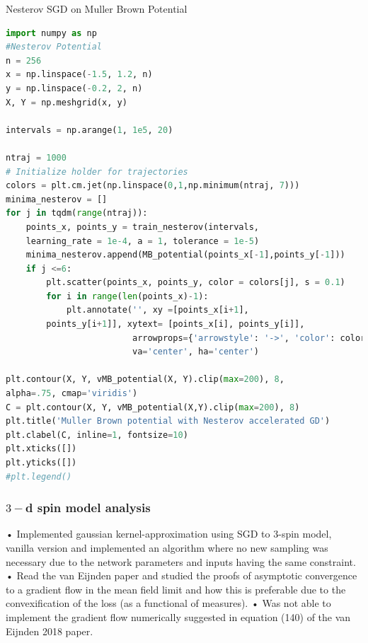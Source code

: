 \documentclass{article}
\begin{document}
\begin{codeblock}{Nesterov SGD on Muller Brown Potential}
\begin{lstlisting}[language=Python]
import numpy as np
#Nesterov Potential 
n = 256
x = np.linspace(-1.5, 1.2, n)
y = np.linspace(-0.2, 2, n)
X, Y = np.meshgrid(x, y)

intervals = np.arange(1, 1e5, 20)

ntraj = 1000
# Initialize holder for trajectories
colors = plt.cm.jet(np.linspace(0,1,np.minimum(ntraj, 7)))
minima_nesterov = []
for j in tqdm(range(ntraj)):
    points_x, points_y = train_nesterov(intervals,
    learning_rate = 1e-4, a = 1, tolerance = 1e-5)
    minima_nesterov.append(MB_potential(points_x[-1],points_y[-1]))
    if j <=6: 
        plt.scatter(points_x, points_y, color = colors[j], s = 0.1)
        for i in range(len(points_x)-1):
            plt.annotate('', xy =[points_x[i+1],
	    points_y[i+1]], xytext= [points_x[i], points_y[i]],
                         arrowprops={'arrowstyle': '->', 'color': colors[j],  'lw': 1},
                         va='center', ha='center')

plt.contour(X, Y, vMB_potential(X, Y).clip(max=200), 8,
alpha=.75, cmap='viridis')
C = plt.contour(X, Y, vMB_potential(X,Y).clip(max=200), 8)
plt.title('Muller Brown potential with Nesterov accelerated GD')
plt.clabel(C, inline=1, fontsize=10)
plt.xticks([])
plt.yticks([])
#plt.legend()    
\end{lstlisting}
    
\end{codeblock}



\subsubsection{$ 3-$d spin model analysis}

•	Implemented gaussian kernel-approximation using SGD to 3-spin model, vanilla version and implemented an algorithm where no new sampling was necessary due to the network parameters and inputs having the same constraint.
•	Read the van Eijnden paper and studied the proofs of asymptotic convergence to a gradient flow in the mean field limit and how this is preferable due to the convexification of the loss (as a functional of measures).
•	Was not able to implement the gradient flow numerically suggested in equation (140) of the van Eijnden 2018 paper. 
\end{document}

